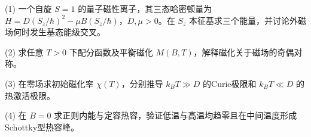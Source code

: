 (1) 一个自旋 \(S=1\) 的量子磁性离子，其三态哈密顿量为 \(H=D(S_z/\hbar)^2-\mu B(S_z/\hbar)\)，\(D,\mu>0\)。在 \(S_z\) 本征基求三个能量，并讨论外磁场何时发生基态能级交叉。

(2) 求任意 \(T>0\) 下配分函数及平衡磁化 \(M(B,T)\)，解释磁化关于磁场的奇偶对称。

(3) 在零场求初始磁化率 \(\chi(T)\)，分别推导 \(k_BT\gg D\) 的Curie极限和 \(k_BT\ll D\) 的热激活极限。

(4) 在 \(B=0\) 求正则内能与定容热容，验证低温与高温均趋零且在中间温度形成Schottky型热容峰。
